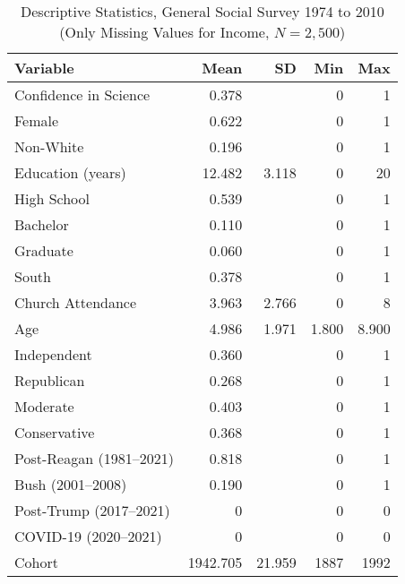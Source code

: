 \begin{table}[ht]
\centering
\begin{tabularx}{\textwidth}{Xrrrr}
\caption{Descriptive Statistics, General Social Survey 1974 to 2010 (Only Missing Values for Income, $N=2,500$)} 
\label{GssStats2010Na} \\
  \toprule
Variable & Mean & SD & Min & Max \\ 
  \midrule
Confidence in Science & 0.378 &  & 0 & 1 \\ 
  Female & 0.622 &  & 0 & 1 \\ 
  Non-White & 0.196 &  & 0 & 1 \\ 
  Education (years) & 12.482 & 3.118 & 0 & 20 \\ 
  High School & 0.539 &  & 0 & 1 \\ 
  Bachelor & 0.110 &  & 0 & 1 \\ 
  Graduate & 0.060 &  & 0 & 1 \\ 
  South & 0.378 &  & 0 & 1 \\ 
  Church Attendance & 3.963 & 2.766 & 0 & 8 \\ 
  Age & 4.986 & 1.971 & 1.800 & 8.900 \\ 
  Independent & 0.360 &  & 0 & 1 \\ 
  Republican & 0.268 &  & 0 & 1 \\ 
  Moderate & 0.403 &  & 0 & 1 \\ 
  Conservative & 0.368 &  & 0 & 1 \\ 
  Post-Reagan (1981--2021) & 0.818 &  & 0 & 1 \\ 
  Bush (2001--2008) & 0.190 &  & 0 & 1 \\ 
  Post-Trump (2017--2021) & 0 &  & 0 & 0 \\ 
  COVID-19 (2020--2021) & 0 &  & 0 & 0 \\ 
  Cohort & 1942.705 & 21.959 & 1887 & 1992 \\ 
   \bottomrule
\end{tabularx}
\end{table}
